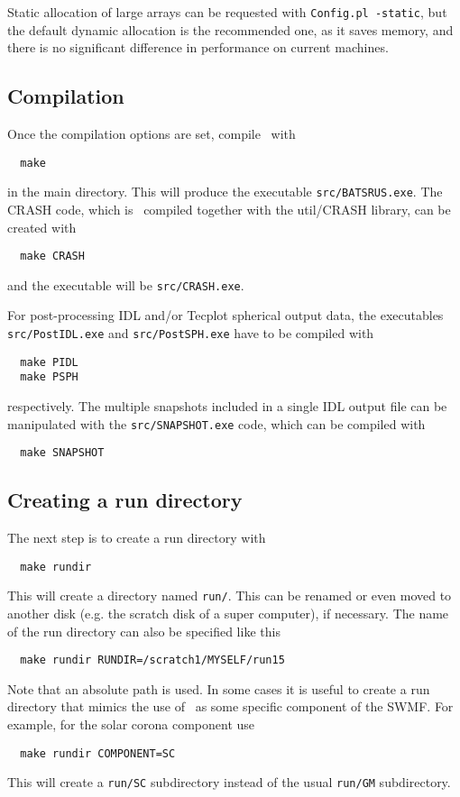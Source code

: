 Static allocation of large arrays can be requested with {\tt Config.pl -static}, 
but the default dynamic allocation is the recommended one, as it saves memory,
and there is no significant difference in performance on current machines.

\subsection{Compilation}

Once the compilation options are set, compile \BATSRUS\ with
\begin{verbatim}
  make
\end{verbatim}
in the main directory. This will produce the executable 
{\tt src/BATSRUS.exe}. The CRASH code, which is \BATSRUS\
compiled together with the util/CRASH library, can be created with
\begin{verbatim}
  make CRASH
\end{verbatim}
and the executable will be {\tt src/CRASH.exe}. 

For post-processing IDL and/or 
Tecplot spherical output data, 
the executables {\tt src/PostIDL.exe} and {\tt src/PostSPH.exe} 
have to be compiled with 
\begin{verbatim}
  make PIDL
  make PSPH
\end{verbatim}
respectively.
The multiple snapshots included in a single IDL output file can be 
manipulated with the {\tt src/SNAPSHOT.exe} code, 
which can be compiled with
\begin{verbatim}
  make SNAPSHOT
\end{verbatim}

\subsection{Creating a run directory}

The next step is to create a run directory with
\begin{verbatim}
  make rundir
\end{verbatim}
This will create a directory named {\tt run/}. This can be renamed
or even moved to another disk (e.g. the scratch disk of a super
computer), if necessary. The name of the run directory can also
be specified like this 
\begin{verbatim}
  make rundir RUNDIR=/scratch1/MYSELF/run15
\end{verbatim}
Note that an absolute path is used. 
In some cases it is useful to create a run directory that mimics
the use of \BATSRUS\ as some specific component of the SWMF. 
For example, for the solar corona component use
\begin{verbatim}
  make rundir COMPONENT=SC
\end{verbatim}
This will create a {\tt run/SC} subdirectory instead of the usual
{\tt run/GM} subdirectory.

